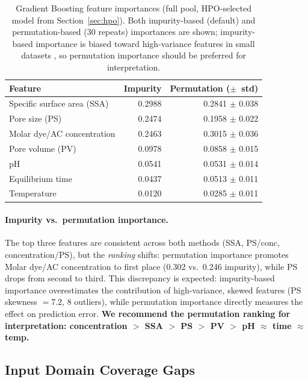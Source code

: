 \documentclass[12pt,a4paper]{article}
\begin{document}
\begin{table}[h]
\centering
\caption{Gradient Boosting feature importances (full pool,
  HPO-selected model from Section~\ref{sec:hpo}).  Both impurity-based
  (default) and permutation-based (30 repeats) importances are shown;
  impurity-based importance is biased toward high-variance features in
  small datasets \citep{Hastie2009}, so permutation importance should be
  preferred for interpretation.}
\label{tab:importance}
\begin{tabular}{lrr}
\toprule
Feature & Impurity & Permutation ($\pm$~std) \\
\midrule
Specific surface area (SSA) & 0.2988 & 0.2841 $\pm$ 0.038 \\
Pore size (PS)              & 0.2474 & 0.1958 $\pm$ 0.022 \\
Molar dye/AC concentration & 0.2463 & 0.3015 $\pm$ 0.036 \\
Pore volume (PV)            & 0.0978 & 0.0858 $\pm$ 0.015 \\
pH                          & 0.0541 & 0.0531 $\pm$ 0.014 \\
Equilibrium time            & 0.0437 & 0.0513 $\pm$ 0.011 \\
Temperature                 & 0.0120 & 0.0285 $\pm$ 0.011 \\
\bottomrule
\end{tabular}
\end{table}

\paragraph{Impurity vs.\ permutation importance.}
The top three features are consistent across both methods (SSA, PS/conc,
concentration/PS), but the \emph{ranking} shifts: permutation importance
promotes Molar dye/AC concentration to first place (0.302 vs.\ 0.246
impurity), while PS drops from second to third.  This discrepancy is
expected: impurity-based importance overestimates the contribution of
high-variance, skewed features (PS skewness $= 7.2$, 8 outliers), while
permutation importance directly measures the effect on prediction error.
\textbf{We recommend the permutation ranking for interpretation:
concentration $>$ SSA $>$ PS $>$ PV $>$ pH $\approx$ time $\approx$ temp.}

\subsection{Input Domain Coverage Gaps}
\end{document}
